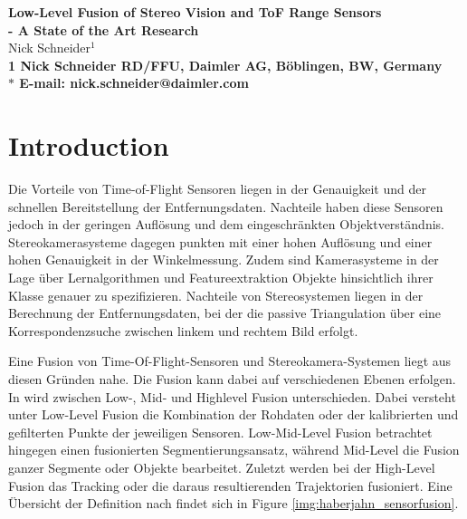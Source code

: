 \documentclass[10pt]{article}
\date{}
\begin{document}
\begin{flushleft}
{\Large
\textbf{Low-Level Fusion of Stereo Vision and ToF Range Sensors\\
		- A State of the Art Research}
}
\\
Nick Schneider$^{1}$
\\
\bf{1} Nick Schneider RD/FFU, Daimler AG, Böblingen, BW, Germany
\\
$\ast$ E-mail: nick.schneider@daimler.com
\end{flushleft}



\section*{Introduction}

Die Vorteile von Time-of-Flight Sensoren liegen in der Genauigkeit und der schnellen Bereitstellung der Entfernungsdaten. Nachteile haben diese Sensoren jedoch in der geringen Auflösung und dem eingeschränkten Objektverständnis. Stereokamerasysteme dagegen punkten mit einer hohen Auflösung und einer hohen Genauigkeit in der Winkelmessung. Zudem sind Kamerasysteme in der Lage über Lernalgorithmen und Featureextraktion Objekte hinsichtlich ihrer Klasse genauer zu spezifizieren. Nachteile von Stereosystemen liegen in der Berechnung der Entfernungsdaten, bei der die passive Triangulation über eine Korrespondenzsuche zwischen linkem und rechtem Bild erfolgt.

Eine Fusion von Time-Of-Flight-Sensoren und Stereokamera-Systemen liegt aus diesen Gründen nahe. Die Fusion kann dabei auf verschiedenen Ebenen erfolgen. In \cite{Haberjahn2010} wird zwischen Low-, Mid- und Highlevel Fusion unterschieden. Dabei versteht \cite{Haberjahn2010} unter Low-Level Fusion die Kombination der Rohdaten oder der kalibrierten und gefilterten Punkte der jeweiligen Sensoren. Low-Mid-Level Fusion betrachtet hingegen einen fusionierten Segmentierungsansatz, während Mid-Level die Fusion ganzer Segmente oder Objekte bearbeitet. Zuletzt werden bei der High-Level Fusion das Tracking oder die daraus resultierenden Trajektorien fusioniert. Eine Übersicht der Definition nach \cite{Haberjahn2010} findet sich in Figure \ref{img:haberjahn_sensorfusion}.
\end{document}
